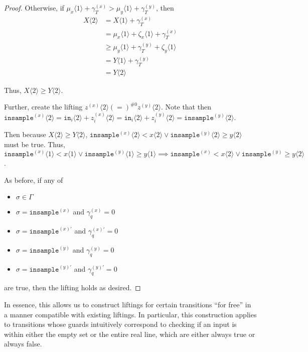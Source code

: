 \documentclass[12pt]{article}
\newcommand{\brangle}[1]{\langle#1 \rangle}
\theoremstyle{definition}
\begin{document}
\begin{proof}
    Otherwise, if $\mu_x\brangle{1}+\gamma_T^{(x)}> \mu_y\brangle{1}+\gamma_T^{(y)}$, then \begin{align*}
        X\brangle{2} &= X\brangle{1} + \gamma_T^{(x)}\\
        &=\mu_x\brangle{1} + \zeta_x\brangle{1} + \gamma_T^{(x)}\\
        &\geq \mu_y\brangle{1} +\gamma_T^{(y)}+\zeta_y\brangle{1}\\
        &=Y\brangle{1} + \gamma_T^{(y)}\\
        &= Y\brangle{2}
    \end{align*}

    Thus, $X\brangle{2}\geq Y\brangle{2}$.

    Further, create the lifting $z^{(x)}\brangle{2}(=)^{\#0}z^{(y)}\brangle{2}$. Note that then $\texttt{insample}^{(x)}\brangle{2}=\texttt{in}_i\brangle{2} + z_i^{(x)}\brangle{2} =\texttt{in}_i\brangle{2} + z_i^{(y)}\brangle{2}=\texttt{insample}^{(y)}\brangle{2}$.

    Then because $X\brangle{2} \geq Y\brangle{2}$, $\texttt{insample}^{(x)}\brangle{2}<x\brangle{2}\lor \texttt{insample}^{(y)}\brangle{2}\geq y\brangle{2}$ must be true. Thus, $\texttt{insample}^{(x)}\brangle{1}<x\brangle{1}\lor\texttt{insample}^{(y)}\brangle{1}\geq y\brangle{1}\implies \texttt{insample}^{(x)}<x\brangle{2}\lor\texttt{insample}^{(y)}\geq y\brangle{2}$.

    As before, if any of \begin{itemize}
        \item $\sigma \in \Gamma$
        \item $\sigma = \texttt{insample}^{(x)}$ and $\gamma_q^{(x)}=0$ 
        \item $\sigma = \texttt{insample}^{(x)\prime}$ and $\gamma_q^{(x)\prime}=0$ 
        \item $\sigma = \texttt{insample}^{(y)}$ and $\gamma_q^{(y)}=0$
        \item $\sigma = \texttt{insample}^{(y)\prime}$ and $\gamma_q^{(y)\prime}=0$
    \end{itemize}
    are true, then the lifting holds as desired. 

\end{proof}

In essence, this allows us to construct liftings for certain transitions ``for free'' in a manner compatible with existing liftings. In particular, this construction applies to transitions whose guards intuitively correspond to checking if an input is within either the empty set or the entire real line, which are either always true or always false. 
\end{document}

